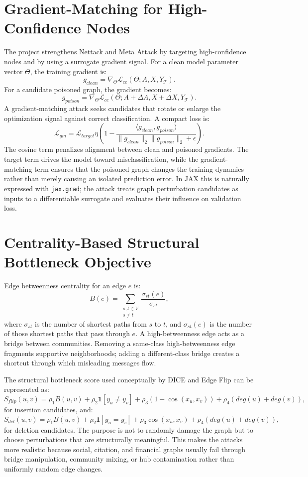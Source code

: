 \documentclass[12pt,oneside]{report}
\begin{document}
\section{Gradient-Matching for High-Confidence Nodes}
The project strengthens Nettack and Meta Attack by targeting high-confidence nodes and by using a surrogate gradient signal. For a clean model parameter vector $\Theta$, the training gradient is:
$$
g_{clean}=\nabla_{\Theta}\mathcal{L}_{ce}(\Theta;A,X,Y_{\mathcal{T}}).
$$
For a candidate poisoned graph, the gradient becomes:
$$
g_{poison}=\nabla_{\Theta}\mathcal{L}_{ce}(\Theta;A+\Delta A,X+\Delta X,Y_{\mathcal{T}}).
$$
A gradient-matching attack seeks candidates that rotate or enlarge the optimization signal against correct classification. A compact loss is:
$$
\mathcal{L}_{gm}=
\mathcal{L}_{target}
\eta\left(1-\frac{\langle g_{clean},g_{poison}\rangle}
{\|g_{clean}\|_2\|g_{poison}\|_2+\epsilon}\right).
$$
The cosine term penalizes alignment between clean and poisoned gradients. The target term drives the model toward misclassification, while the gradient-matching term ensures that the poisoned graph changes the training dynamics rather than merely causing an isolated prediction error. In JAX this is naturally expressed with \texttt{jax.grad}; the attack treats graph perturbation candidates as inputs to a differentiable surrogate and evaluates their influence on validation loss.

\section{Centrality-Based Structural Bottleneck Objective}
Edge betweenness centrality for an edge $e$ is:
$$
B(e)=\sum_{\substack{s,t\in V\\s\neq t}}\frac{\sigma_{st}(e)}{\sigma_{st}},
$$
where $\sigma_{st}$ is the number of shortest paths from $s$ to $t$, and $\sigma_{st}(e)$ is the number of those shortest paths that pass through $e$. A high-betweenness edge acts as a bridge between communities. Removing a same-class high-betweenness edge fragments supportive neighborhoods; adding a different-class bridge creates a shortcut through which misleading messages flow.

The structural bottleneck score used conceptually by DICE and Edge Flip can be represented as:
$$
S_{flip}(u,v)=
\rho_1 B(u,v)+
\rho_2\mathbf{1}[y_u\neq y_v]+
\rho_3(1-\cos(x_u,x_v))+
\rho_4\left(deg(u)+deg(v)\right),
$$
for insertion candidates, and:
$$
S_{del}(u,v)=
\rho_1 B(u,v)+
\rho_2\mathbf{1}[y_u=y_v]+
\rho_3\cos(x_u,x_v)+
\rho_4\left(deg(u)+deg(v)\right),
$$
for deletion candidates. The purpose is not to randomly damage the graph but to choose perturbations that are structurally meaningful. This makes the attacks more realistic because social, citation, and financial graphs usually fail through bridge manipulation, community mixing, or hub contamination rather than uniformly random edge changes.
\end{document}
